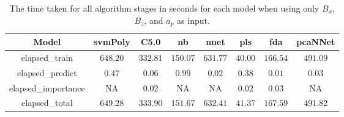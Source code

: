 \begin{table}[!ht]
	\centering
	\begin{tabular}{|c|c|c|c|c|c|c|c|}
		\hline
		Model & svmPoly & C5.0 & nb & nnet & pls & fda & pcaNNet \\ \hline
		elapsed_train & $648.20$ & $332.81$ & $150.07$ & $631.77$ & $40.00$ & $166.54$ & $491.09$ \\ \hline
		elapsed_predict & $0.47$ & $0.06$ & $0.99$ & $0.02$ & $0.38$ & $0.01$ & $0.03$ \\ \hline
		elapsed_importance & NA & $0.02$ & NA & NA & $0.02$ & $0.03$ & NA \\ \hline
		elapsed_total & $649.28$ & $333.90$ & $151.67$ & $632.41$ & $41.37$ & $167.59$ & $491.82$ \\ \hline
	\end{tabular}
	\caption{The time taken for all algorithm stages in seconds for each model when using only $B_{x}$, $B_{z}$, and $a_{p}$ as input.}
	\label{tab:time:reverse:xzap}
\end{table}
